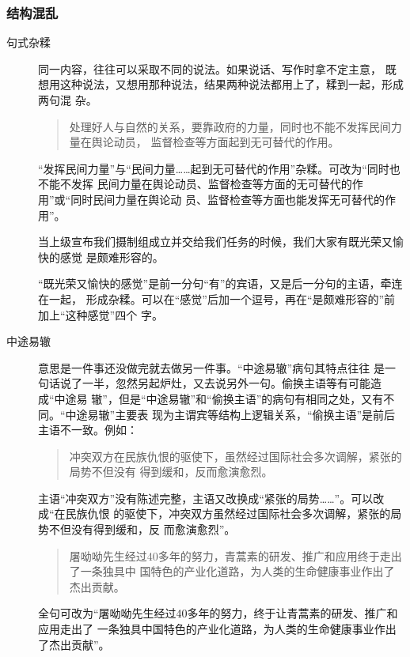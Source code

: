\documentclass[final,oneside]{ctexbook}
\newenvironment{equotation}{\begin{quotation}\kaishu}{\end{quotation}}
\begin{document}
\subsubsection{结构混乱}

\begin{description}

  \item[句式杂糅] 同一内容，往往可以采取不同的说法。如果说话、写作时拿不定主意，
    既想用这种说法，又想用那种说法，结果两种说法都用上了，糅到一起，形成两句混
    杂。

    \begin{equotation}
      处理好人与自然的关系，要靠政府的力量，同时也不能不发挥民间力量在舆论动员，
      监督检查等方面起到无可替代的作用。
    \end{equotation}

    “发挥民间力量”与“民间力量……起到无可替代的作用”杂糅。可改为“同时也不能不发挥
    民间力量在舆论动员、监督检查等方面的无可替代的作用”或“同时民间力量在舆论动
    员、监督检查等方面也能发挥无可替代的作用”。

    当上级宣布我们摄制组成立并交给我们任务的时候，我们大家有既光荣又愉快的感觉
    是颇难形容的。

    “既光荣又愉快的感觉”是前一分句“有”的宾语，又是后一分句的主语，牵连在一起，
    形成杂糅。可以在“感觉”后加一个逗号，再在“是颇难形容的”前加上“这种感觉”四个
    字。

  \item[中途易辙] 意思是一件事还没做完就去做另一件事。“中途易辙”病句其特点往往
    是一句话说了一半，忽然另起炉灶，又去说另外一句。偷换主语等有可能造成“中途易
    辙”，但是“中途易辙”和“偷换主语”的病句有相同之处，又有不同。“中途易辙”主要表
    现为主谓宾等结构上逻辑关系，“偷换主语”是前后主语不一致。例如：

    \begin{equotation}
      冲突双方在民族仇恨的驱使下，虽然经过国际社会多次调解，紧张的局势不但没有
      得到缓和，反而愈演愈烈。
    \end{equotation}

    主语“冲突双方”没有陈述完整，主语又改换成“紧张的局势……”。可以改成“在民族仇恨
    的驱使下，冲突双方虽然经过国际社会多次调解，紧张的局势不但没有得到缓和，反
    而愈演愈烈”。

    \begin{equotation}
      屠呦呦先生经过40多年的努力，青蒿素的研发、推广和应用终于走出了一条独具中
      国特色的产业化道路，为人类的生命健康事业作出了杰出贡献。
    \end{equotation}

    全句可改为“屠呦呦先生经过40多年的努力，终于让青蒿素的研发、推广和应用走出了
    一条独具中国特色的产业化道路，为人类的生命健康事业作出了杰出贡献”。

\end{description}
\end{document}
